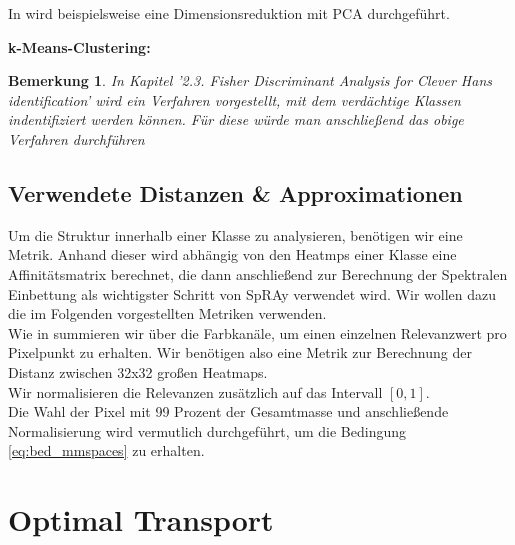 \documentclass[11pt,a4paper]{article}
\newtheorem{remark}[theorem]{Bemerkung}
\numberwithin{equation}{section}
\begin{document}
	In \cite{AC} wird beispielsweise eine Dimensionsreduktion mit PCA durchgeführt.
	
	\noindent \textbf{k-Means-Clustering:}\\
	\begin{remark}
		In \cite{imagenet_unhansed_v1} Kapitel '2.3. Fisher Discriminant Analysis for Clever Hans
		identification' wird ein Verfahren vorgestellt, mit dem verdächtige Klassen indentifiziert werden können. Für diese würde man anschließend das obige Verfahren durchführen
	\end{remark}
	\subsection{Verwendete Distanzen \& Approximationen}
	Um die Struktur innerhalb einer Klasse zu analysieren, benötigen wir eine Metrik.
	Anhand dieser wird abhängig von den Heatmps einer Klasse eine Affinitätsmatrix berechnet, die dann anschließend zur Berechnung der Spektralen Einbettung als wichtigster Schritt von SpRAy verwendet wird. Wir wollen dazu die im Folgenden vorgestellten Metriken verwenden.\\
	Wie in \cite{imagenet_unhansed_v1} summieren wir über die Farbkanäle, um einen einzelnen Relevanzwert pro Pixelpunkt zu erhalten. Wir benötigen also eine Metrik zur Berechnung der Distanz zwischen 32x32 großen Heatmaps.\\
	Wir normalisieren die Relevanzen zusätzlich auf das Intervall $[0,1]$.\\
	Die Wahl der Pixel mit 99 Prozent der Gesamtmasse und anschließende Normalisierung wird vermutlich durchgeführt, um die Bedingung \autoref{eq:bed_mmspaces} zu erhalten.
	\section{Optimal Transport}
	\label{chapter_algorithm}
	
\end{document}
